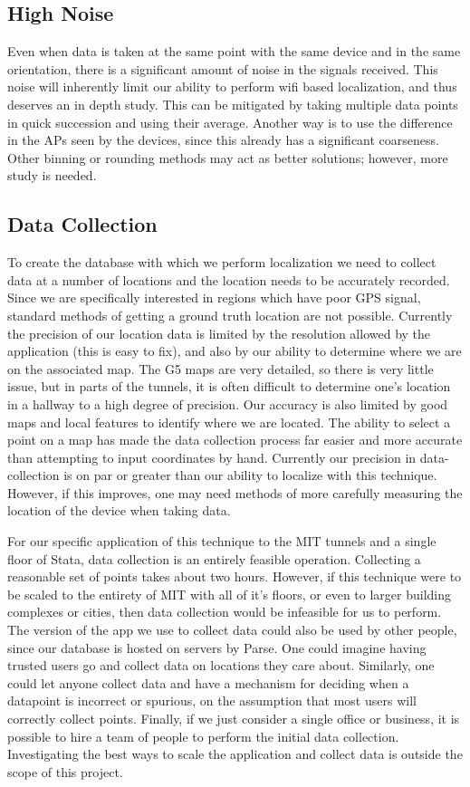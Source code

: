 \documentclass[11pt]{article}
\begin{document}
\subsection{High Noise}
Even when data is taken at the same point with the same device and in the same orientation, there is a significant amount of noise in the signals received. This noise will inherently limit our ability to perform wifi based localization, and thus deserves an in depth study. This can be mitigated by taking multiple data points in quick succession and using their average. Another way is to use the difference in the APs seen by the devices, since this already has a significant coarseness. Other binning or rounding methods may act as better solutions; however, more study is needed.
\subsection{Data Collection}
To create the database with which we perform localization we need to collect data at a number of locations and the location needs to be accurately recorded. Since we are specifically interested in regions which have poor GPS signal, standard methods of getting a ground truth location are not possible. Currently the precision of our location data is limited by the resolution allowed by the application (this is easy to fix), and also by our ability to determine where we are on the associated map. The G5 maps are very detailed, so there is very little issue, but in parts of the tunnels, it is often difficult to determine one’s location in a hallway to a high degree of precision. Our accuracy is also limited by good maps and local features to identify where we are located. The ability to select a point on a map has made the data collection process far easier and more accurate than attempting to input coordinates by hand. Currently our precision in data-collection is on par or greater than our ability to localize with this technique. However, if this improves, one may need methods of more carefully measuring the location of the device when taking data.

For our specific application of this technique to the MIT tunnels and a single floor of Stata, data collection is an entirely feasible operation. Collecting a reasonable set of points takes about two hours. However, if this technique were to be scaled to the entirety of MIT with all of it’s floors, or even to larger building complexes or cities, then data collection would be infeasible for us to perform. The version of the app we use to collect data could also be used by other people, since our database is hosted on servers by Parse. One could imagine having trusted users go and collect data on locations they care about. Similarly, one could let anyone collect data and have a mechanism for deciding when a datapoint is incorrect or spurious, on the assumption that most users will correctly collect points. Finally, if we just consider a single office or business, it is possible to hire a team of people to perform the initial data collection. Investigating the best ways to scale the application and collect data is outside the scope of this project.
\end{document}
